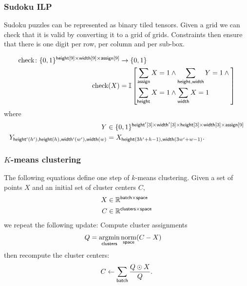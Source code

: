 \documentclass{article}
\newcommand{\reals}{\mathbb{R}}
\begin{document}
\subsubsection{Sudoku ILP}

Sudoku puzzles can be represented as  binary tiled tensors.
Given a grid we can check that it is valid by converting it to a grid of grids. 
Constraints then ensure that there is one digit per row, per column and per sub-box.

\begin{align*}
\text{check} \colon \{0, 1\}^{\mathsf{height}[9] \times \mathsf{width}[9] \times \mathsf{assign}[9]} &\rightarrow \{0, 1\} \\
\text{check}(X) &=
\mathbb{I}\left[\begin{aligned}
\sum\limits_{\mathsf{assign}} X = 1 &\land \sum\limits_{\mathsf{height, width}} Y = 1 \land {} \\
\sum\limits_{\mathsf{height}} X = 1 &\land \sum\limits_{\mathsf{width}} X = 1
\end{aligned}\right]
\end{align*}
where
\begin{align*}
Y &\in \{0, 1\}^{\mathsf{height'}[3] \times \mathsf{width'}[3] \times \mathsf{height}[3] \times \mathsf{width}[3] \times \mathsf{assign}[9]}  \\
Y_{\mathsf{height'}(h'), \mathsf{height}(h), \mathsf{width'}(w'), \mathsf{width}(w)} &= X_{\mathsf{height}(3h' + h-1), \mathsf{width}(3 w' + w-1)}.
\end{align*} 

\subsubsection{$K$-means clustering}

The following equations define one step of $k$-means clustering. Given a set of points $X$ and an initial set of cluster centers $C$,
\begin{align*}
  X &\in \reals^{\name{batch} \times \name{space}} \\
C &\in \reals^{\name{clusters} \times \name{space}}
\end{align*}
we repeat the following update: Compute cluster assignments
\begin{align*}
Q &= \mathop{\underset{\mathsf{clusters}}{\mathrm{argmin}}} \mathop{\underset{\mathsf{space}}{\mathrm{norm}}}(C-X)
\end{align*}
then recompute the cluster centers:
\begin{equation*}
C \leftarrow \sum\limits_{\mathsf{batch}} \frac{Q \odot X}{Q}.
\end{equation*}
\end{document}
